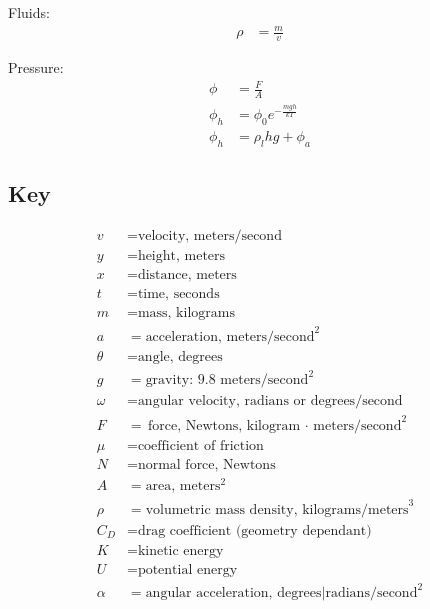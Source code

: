 \documentclass[10pt, letterpaper]{book}
\begin{document}
\begin{multicols*}{2}
        Fluids:
        \begin{align}
            \rho    & = \frac{m}{v}                             
        \end{align}

        Pressure:
        \begin{align}
            \phi    & = \frac{F}{A}                             \\
            \phi_{h}& = \phi_{0}e^{-\frac{mgh}{kT}}             \\
            \phi_{h}& = \rho_{l}hg + \phi_{a}
        \end{align}

    \end{multicols*}

    \pagebreak

    \subsection*{Key}
    \begin{align*}
        v       & = \text{velocity, meters/second}                                  \\
        y       & = \text{height, meters}                                           \\
        x       & = \text{distance, meters}                                         \\
        t       & = \text{time, seconds}                                            \\
        m       & = \text{mass, kilograms}                                          \\
        a       & = \text{acceleration, meters/second}^{2}                          \\
        \theta  & = \text{angle, degrees}                                           \\
        g       & = \text{gravity: 9.8 meters/second}^{2}                           \\
        \omega  & = \text{angular velocity, radians or degrees/second}              \\
        F       & = \text{force, Newtons, kilogram $\cdot$ meters/second}^{2}       \\
        \mu     & = \text{coefficient of friction}                                  \\
        N       & = \text{normal force, Newtons}                                    \\
        A       & = \text{area, meters}^{2}                                         \\
        \rho    & = \text{volumetric mass density, kilograms/meters}^{3}            \\
        C_{D}   & = \text{drag coefficient (geometry dependant)}                    \\
        K       & = \text{kinetic energy}                                           \\
        U       & = \text{potential energy}                                         \\
        \alpha  & = \text{angular acceleration, degrees|radians/second}^{2}
    \end{align*}
\end{document}
